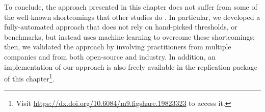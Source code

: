 
To conclude, the approach presented in this chapter does not suffer from some of the well-known shortcomings that other studies do \cite{Khomyakov2020}.
In particular, we developed a fully-automated approach that does not rely on hand-picked thresholds, or benchmarks, but instead uses machine learning to overcome these shortcomings; then, we validated the approach by involving practitioners from multiple companies and from both open-source and industry.
In addition, an implementation of our approach is also freely available in the replication package of this chapter\footnote{Visit \url{https://dx.doi.org/10.6084/m9.figshare.19823323} to access it.}.

